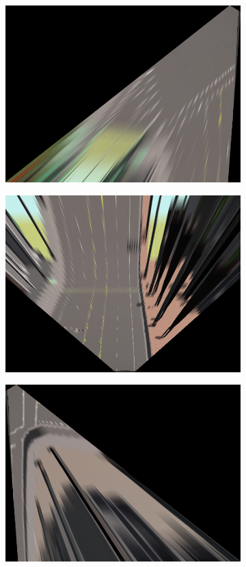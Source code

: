\begin{figure}[h!]
    \begin{subfigure}[c]{.33\textwidth}
      \centering
      \includegraphics[width=.9\linewidth]{img/warp2.png}
    \end{subfigure}%
    \begin{subfigure}[c]{.33\textwidth}
      \centering
      \includegraphics[width=.9\linewidth]{img/warp1.png}
    \end{subfigure}%
    \begin{subfigure}[c]{.33\textwidth}
        \centering
        \includegraphics[width=.9\linewidth]{img/warp3.png}
    \end{subfigure}
    

\end{figure}
